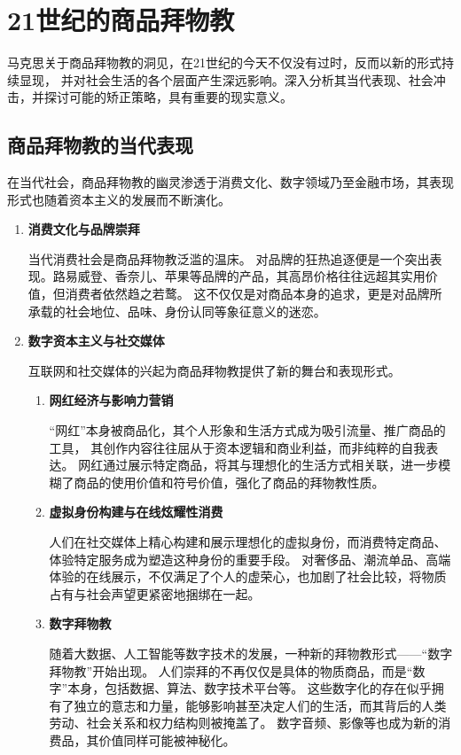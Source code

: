 \section{21世纪的商品拜物教}
马克思关于商品拜物教的洞见，在21世纪的今天不仅没有过时，反而以新的形式持续显现，
并对社会生活的各个层面产生深远影响。深入分析其当代表现、社会冲击，并探讨可能的矫正策略，具有重要的现实意义。
\subsection{商品拜物教的当代表现}
在当代社会，商品拜物教的幽灵渗透于消费文化、数字领域乃至金融市场，其表现形式也随着资本主义的发展而不断演化。
\begin{enumerate}
    \item \textbf{消费文化与品牌崇拜}

    当代消费社会是商品拜物教泛滥的温床。
    对品牌的狂热追逐便是一个突出表现。路易威登、香奈儿、苹果等品牌的产品，其高昂价格往往远超其实用价值，但消费者依然趋之若鹜。
    这不仅仅是对商品本身的追求，更是对品牌所承载的社会地位、品味、身份认同等象征意义的迷恋。

    \item \textbf{数字资本主义与社交媒体}

    互联网和社交媒体的兴起为商品拜物教提供了新的舞台和表现形式\autocite{Xu2022}。

    \begin{enumerate}
        \item \textbf{网红经济与影响力营销}

        “网红”本身被商品化，其个人形象和生活方式成为吸引流量、推广商品的工具，
        其创作内容往往屈从于资本逻辑和商业利益，而非纯粹的自我表达。
        网红通过展示特定商品，将其与理想化的生活方式相关联，进一步模糊了商品的使用价值和符号价值，强化了商品的拜物教性质。
        \item \textbf{虚拟身份构建与在线炫耀性消费}

        人们在社交媒体上精心构建和展示理想化的虚拟身份，而消费特定商品、体验特定服务成为塑造这种身份的重要手段。
        对奢侈品、潮流单品、高端体验的在线展示，不仅满足了个人的虚荣心，也加剧了社会比较，将物质占有与社会声望更紧密地捆绑在一起。
        \item \textbf{数字拜物教}

        随着大数据、人工智能等数字技术的发展，一种新的拜物教形式——“数字拜物教”开始出现。
        人们崇拜的不再仅仅是具体的物质商品，而是“数字”本身，包括数据、算法、数字技术平台等。
        这些数字化的存在似乎拥有了独立的意志和力量，能够影响甚至决定人们的生活，而其背后的人类劳动、社会关系和权力结构则被掩盖了。
        数字音频、影像等也成为新的消费品，其价值同样可能被神秘化。
    \end{enumerate}

\end{enumerate}

